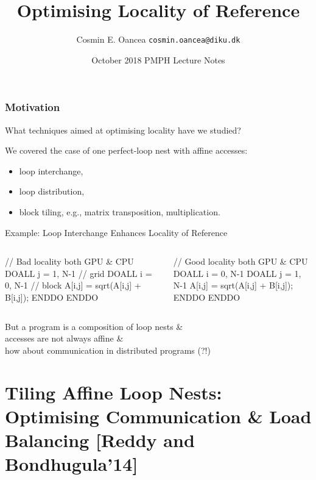 \documentclass{beamer}
\title[Locality]{Optimising Locality of Reference}
\author[C.~Oancea]{Cosmin E. Oancea {\tt cosmin.oancea@diku.dk}}
\institute{Department of Computer Science (DIKU)\\University of Copenhagen}
\date[Oct 2018]{October 2018 PMPH Lecture Notes}
\newcommand{\emphh}[1]{\textcolor{CosGreen}{ #1}}
\begin{document}
\titleslide




\begin{frame}[fragile,t]
  \frametitle{Motivation}

\alert{What techniques aimed at optimising locality have we studied?}\pause\smallskip

\emphh{We covered the case of one perfect-loop nest with affine accesses}:
\begin{itemize}
    \item loop interchange,
    \item loop distribution,
    \item block tiling, e.g., matrix transposition, multiplication.
\end  {itemize}\bigskip

\begin{block}{Example: Loop Interchange Enhances Locality of Reference}
\begin{columns}
\begin{colorcode}
// Bad locality both GPU \& CPU
\emphh{DOALL j = 1, N-1} // grid
  \emphh{DOALL i = 0, N-1} // block
    A[i,j] = sqrt(A[i,j] + B[i,j]);
  ENDDO
ENDDO
\end{colorcode}
\begin{colorcode}
// Good locality both GPU \& CPU
\emphh{DOALL i = 0, N-1}
  \emphh{DOALL j = 1, N-1}    
    A[i,j] = sqrt(A[i,j] + B[i,j]);
  ENDDO
ENDDO
\end{colorcode}
\end{columns}
\end{block} 
 
\alert{But a program is a composition of loop nests \&\\ 
accesses are not always affine \&\\
how about communication in distributed programs (?!)}

\end{frame}


\begin{frame}[fragile]
	\tableofcontents
\end{frame}

\section{Tiling Affine Loop Nests: Optimising Communication \& Load Balancing [Reddy and Bondhugula'14]}
\end{document}
